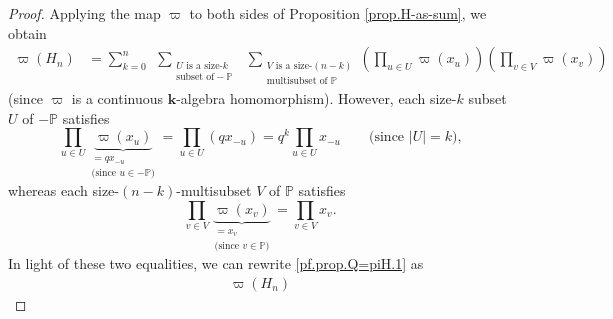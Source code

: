 \documentclass[revision]{FPSAC2024}
\newcommand{\PP}{\mathbb{P}} %
\newcommand{\kk}{\mathbf{k}} %
\begin{document}
\begin{proof}
Applying the map $\varpi$ to both sides of Proposition \ref{prop.H-as-sum}, we obtain%
\begin{align}
\varpi\left(  H_{n}\right)   
&  =\sum_{k=0}^{n}
\ \ \sum_{\substack{U\text{ is a size-}k\\\text{subset of
}-\mathbb{P}}}
\ \ \sum_{\substack{V\text{ is a size-}\left(  n-k\right)
\\\text{multisubset of }\mathbb{P}}}
\left(  \prod_{u\in U}\varpi\left(  x_{u}\right) \right)
\left(  \prod_{v\in V}\varpi\left(  x_{v}\right) \right)
\label{pf.prop.Q=piH.1}
\end{align}
(since $\varpi$ is a continuous $\kk$-algebra homomorphism).
However, each size-$k$ subset $U$ of $-\PP$ satisfies
\[
\prod_{u\in U}\underbrace{\varpi
\left(  x_{u}\right)  }_{\substack{=qx_{-u}\\
\text{(since }u\in-\mathbb{P}\text{)}}}
= \prod_{u\in U}\left(qx_{-u}\right) = q^k\prod_{u \in U} x_{-u}
\qquad \text{(since $\left\vert U\right\vert =k$),}
\]
whereas each size-$\left(n-k\right)$-multisubset $V$ of $\PP$
satisfies
\[
\prod_{v\in V}\underbrace{\varpi\left(  x_{v}\right)
}_{\substack{=x_{v}\\\text{(since }v\in\mathbb{P}\text{)}}}
= \prod_{v\in V} x_v.
\]
In light of these two equalities, we can rewrite
\eqref{pf.prop.Q=piH.1} as
\begin{align*}
\varpi\left(  H_{n}\right)   

\end{align*}
\end{proof}
\end{document}
